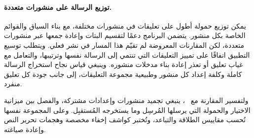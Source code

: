 \paragraph{توزيع الرسالة على منشورات متعددة.}
\label{par:cross-post-extension}
يمكن توزيع حمولة أطول على تعليقات في منشورات مختلفة، مع بناء السياق والقوائم الخاصة بكل منشور. يتضمن البرنامج دعمًا لتقسيم البتات وإعادة جمعها عبر منشورات متعددة، لكن المقارنات المعروضة لم تقيّم هذا المسار في نشر فعلي. ويتطلب توسيع التطبيق اتفاقًا على تمييز التعليقات التي تنتمي إلى الرسالة نفسها وترتيبها، والتعامل مع غياب تعليق أو تعذر إعادة بناء مدخلات منشوره. وينبغي قياس نجاح استخراج الرسالة كاملة وكلفة إعداد كل منشور وطبيعية مجموعة التعليقات، إلى جانب جودة كل تعليق منفرد.

ولتفسير المقارنة مع ~\cite{lin2024zero}، ينبغي تجميد منشورات وإعدادات مشتركة، والفصل بين ميزانية الاختيار والحمولة التي يرسلها المُرسِل وما يستخرجه المُستقبِل.
وعلى المجموعة نفسها تُحسب مقاييس الطلاقة والتباعد، وتُختبر كواشف إخفاء مخصصة وهجمات تحرير النص وإعادة صياغته.
